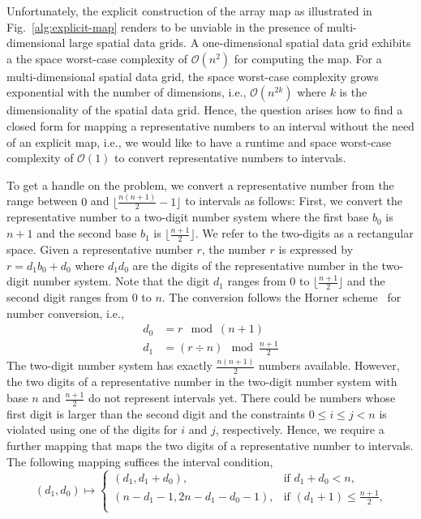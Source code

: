 \documentclass[AMA,LATO1COL]{WileyNJD-v2}
\newcommand\bigo{\mathcal O}
\begin{document}
Unfortunately, the explicit construction of the array map as illustrated in Fig.~\ref{alg:explicit-map} renders to be unviable in the presence of multi-dimensional large spatial data grids. A one-dimensional spatial data grid exhibits a the space worst-case complexity of $\bigo(n^2)$ for computing the map. For a multi-dimensional spatial data grid, the space worst-case complexity grows exponential with the number of dimensions, i.e., $\bigo(n^{2k})$ where $k$ is the dimensionality of the spatial data grid.  Hence, the question arises how to find a closed form for mapping a representative numbers to an interval without the need of an explicit map, i.e., we would like to have a runtime and space worst-case complexity of $\bigo(1)$ to convert representative numbers to intervals.

To get a handle on the problem, we convert a representative number from the range between $0$ and $ \lfloor \frac{n(n+1)}{2}-1 \rfloor$ to intervals as follows: First, we convert the representative number to a two-digit number system where the first base $b_0$ is $n+1$ and the second base $b_1$ is $ \lfloor \frac{n+1}{2} \rfloor$. We refer to the two-digits as a rectangular space. Given a representative number $r $, the number $r$ is expressed by $r = d_1 b_0 + d_0$ where $d_1 d_0$ are the digits of the representative number in the two-digit number system. Note that the digit $d_1$ ranges from $0$ to $ \lfloor \frac{n+1}{2} \rfloor$ and the second digit ranges from $0$ to $n$.  The conversion follows the Horner scheme~\cite{refernce-for-conversion-needed} for number conversion, i.e.,
\begin{align*}
d_0 &= r\mod (n+1) \\
d_1 &= (r \div n) \mod \frac{n+1}{2}
\end{align*}
The two-digit number system has exactly $\frac{n(n+1)}{2}$ numbers available. However, the two digits of a representative number in the two-digit number system with base $n$ and $\frac{n+1}{2}$ do not represent intervals yet. There could be numbers whose first digit is larger than the second digit and the constraints $0 \leq i \leq j < n$ is violated using one of the digits for $i$ and $j$, respectively.  Hence, we require a further mapping that maps the two digits of a representative number to intervals.  The following mapping suffices the interval condition,
\begin{equation*}
(d_1, d_0) \mapsto
\begin{cases}
(d_1, d_1 + d_0), & \mbox{if $d_1 + d_0 < n$,} \\
(n - d_1 - 1, 2 n - d_1 - d_0 -1), & \mbox{if $(d_1 + 1) \leq \frac{n+1}{2}$,} \\
\end{cases}
\end{equation*}
\end{document}
